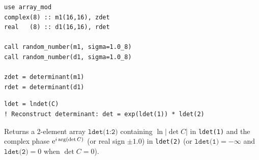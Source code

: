 \begin{description}[leftmargin=2.2cm, style=nextline]
\end{description}

\lstset{language=[95]Fortran}
\begin{lstlisting}
use array_mod
complex(8) :: m1(16,16), zdet
real   (8) :: d1(16,16), rdet

call random_number(m1, sigma=1.0_8)
call random_number(d1, sigma=1.0_8)

zdet = determinant(m1)
rdet = determinant(d1)
\end{lstlisting}


\lstset{language=[95]Fortran}
\begin{lstlisting}
ldet = lndet(C)
! Reconstruct determinant: det = exp(ldet(1)) * ldet(2)
\end{lstlisting}

Returns a 2-element array $\texttt{ldet(1:2)}$ containing $\ln|\det C|$ in \texttt{ldet(1)} and the complex phase ${\rm e}^{i\arg(\det C)}$ (or real sign $\pm 1.0$) in \texttt{ldet(2)} (or $\texttt{ldet(1)} = -\infty$ and $\texttt{ldet(2)} = 0$ when $\det C = 0$).


